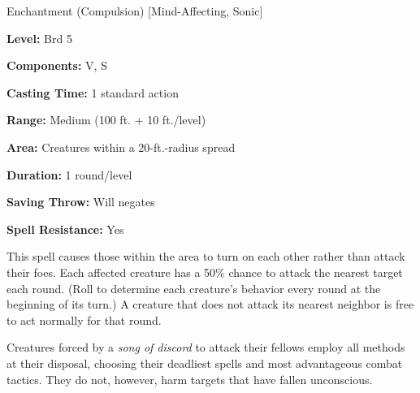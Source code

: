 
Enchantment (Compulsion) [Mind-Affecting, Sonic]

\textbf{Level:} Brd 5

\textbf{Components:} V, S

\textbf{Casting Time:} 1 standard action

\textbf{Range:} Medium (100 ft. + 10 ft./level)

\textbf{Area:} Creatures within a 20-ft.-radius spread

\textbf{Duration:} 1 round/level

\textbf{Saving Throw:} Will negates

\textbf{Spell Resistance:} Yes

This spell causes those within the area to turn on each other rather than attack 
their foes. Each affected creature has a 50\% chance to attack the nearest target 
each round. (Roll to determine each creature's behavior every round at the beginning 
of its turn.) A creature that does not attack its nearest neighbor is free to act 
normally for that round.

Creatures forced by a \textit{song of discord} to attack their fellows employ all 
methods at their disposal, choosing their deadliest spells and most advantageous 
combat tactics. They do not, however, harm targets that have fallen unconscious.


